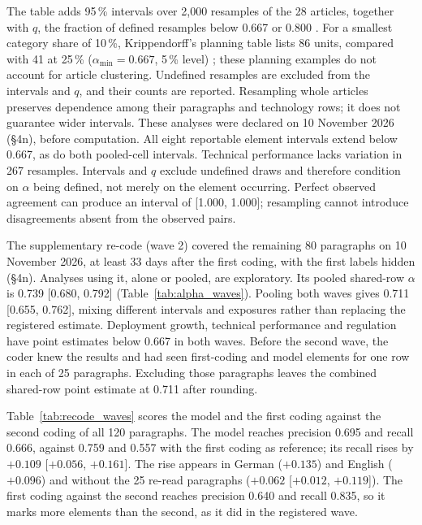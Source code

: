 The table adds 95\,\% intervals over 2{,}000 resamples of the 28 articles, together with $q$, the fraction of defined resamples below 0.667 or 0.800 \parencite[pp.~237--238]{krippendorff2004contentanalysis}. For a smallest category share of 10\,\%, Krippendorff's planning table lists 86 units, compared with 41 at 25\,\% ($\alpha_{\min}=0.667$, 5\,\% level) \parencite[p.~240]{krippendorff2004contentanalysis}; these planning examples do not account for article clustering. Undefined resamples are excluded from the intervals and $q$, and their counts are reported. Resampling whole articles preserves dependence among their paragraphs and technology rows; it does not guarantee wider intervals. These analyses were declared on 10 November 2026 (\S4n), before computation. All eight reportable element intervals extend below 0.667, as do both pooled-cell intervals. Technical performance lacks variation in 267 resamples. Intervals and $q$ exclude undefined draws and therefore condition on $\alpha$ being defined, not merely on the element occurring. Perfect observed agreement can produce an interval of [1.000, 1.000]; resampling cannot introduce disagreements absent from the observed pairs.

The supplementary re-code (wave 2) covered the remaining 80 paragraphs on 10 November 2026, at least 33 days after the first coding, with the first labels hidden (\S4n). Analyses using it, alone or pooled, are exploratory. Its pooled shared-row $\alpha$ is 0.739 [0.680, 0.792] (Table~\ref{tab:alpha_waves}). Pooling both waves gives 0.711 [0.655, 0.762], mixing different intervals and exposures rather than replacing the registered estimate. Deployment growth, technical performance and regulation have point estimates below 0.667 in both waves. Before the second wave, the coder knew the results and had seen first-coding and model elements for one row in each of 25 paragraphs. Excluding those paragraphs leaves the combined shared-row point estimate at 0.711 after rounding.

\appkeepheads\appout

Table~\ref{tab:recode_waves} scores the model and the first coding against the second coding of all 120 paragraphs. The model reaches precision 0.695 and recall 0.666, against 0.759 and 0.557 with the first coding as reference; its recall rises by $+0.109$ [$+0.056$, $+0.161$]. The rise appears in German ($+0.135$) and English ($+0.096$) and without the 25 re-read paragraphs ($+0.062$ [$+0.012$, $+0.119$]). The first coding against the second reaches precision 0.640 and recall 0.835, so it marks more elements than the second, as it did in the registered wave.

